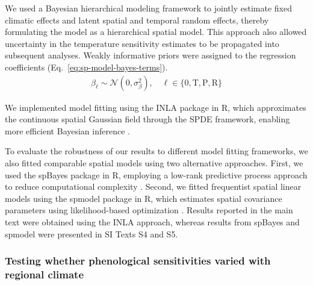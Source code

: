 We used a Bayesian hierarchical modeling framework to jointly estimate fixed climatic effects and latent spatial and temporal random effects, thereby formulating the model as a hierarchical spatial model. This approach also allowed uncertainty in the temperature sensitivity estimates to be propagated into subsequent analyses. Weakly informative priors were assigned to the regression coefficients (Eq.~\ref{eq:sp-model-bayes-terms}).
\begin{eqnarray}
\beta_{\ell} \sim \mathcal{N}(0, \sigma_\beta^2), \quad {\ell} \in \{0, {\text{T}}, {\text{P}}, {\text{R}}\}
\label{eq:sp-model-bayes-terms}
\end{eqnarray}

We implemented model fitting using the INLA package in R, which approximates the continuous spatial Gaussian field through the SPDE framework, enabling more efficient Bayesian inference \citep{Rue2009JRSSB}. 

To evaluate the robustness of our results to different model fitting frameworks, we also fitted comparable spatial models using two alternative approaches. First, we used the spBayes package in R, employing a low-rank predictive process approach to reduce computational complexity \citep{Finley2015JSS, finley_spbayes_2007}. Second, we fitted frequentist spatial linear models using the spmodel package in R, which estimates spatial covariance parameters using likelihood-based optimization \citep{dumelle_spmodel_2023}. Results reported in the main text were obtained using the INLA approach, whereas results from spBayes and spmodel were presented in SI Texts S4 and S5.

\subsubsection{Testing whether phenological sensitivities varied with regional climate}

